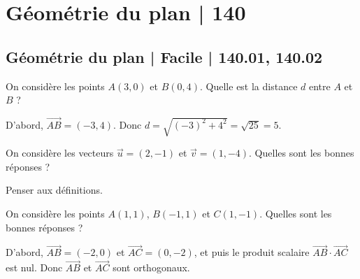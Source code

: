 



\section{Géométrie du plan | 140}

\subsection{Géométrie du plan | Facile | 140.01, 140.02}

\begin{question}
On considère les points $A(3,0)$ et $B(0,4)$. Quelle est la distance $d$ entre $A$ et $B$ ?
\begin{answers}  
\end{answers}
\begin{explanations}
D'abord, $\overrightarrow{AB}=(-3,4)$. Donc $d=\sqrt{(-3)^2+4^2}=\sqrt{25}=5$.
\end{explanations}
\end{question}

\begin{question}
On considère les vecteurs $\vec{u}=(2,-1)$ et $\vec{v}=(1,-4)$. Quelles sont les bonnes réponses ?
\begin{answers}  
\end{answers}
\begin{explanations}
Penser aux définitions.
\end{explanations}
\end{question}


\begin{question}
On considère les points $A(1,1)$, $B(-1,1)$ et $C(1,-1)$. Quelles sont les bonnes réponses ?
\begin{answers}  
\end{answers}
\begin{explanations}
D'abord, $\overrightarrow{AB}=(-2,0)$ et $\overrightarrow{AC}=(0,-2)$, et puis le produit scalaire $\overrightarrow{AB}\cdot\overrightarrow{AC}$ est nul. Donc $\overrightarrow{AB}$ et $\overrightarrow{AC}$ sont orthogonaux.
\end{explanations}
\end{question}


